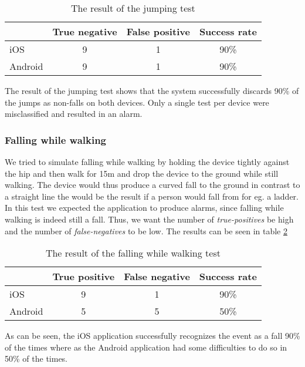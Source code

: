 \documentclass[12pt, a4paper, onecolumn]{article}
\begin{document}
			\begin{table}[H]
			\centering
			\begin{tabular}{|l|c|c|c|}
				\hline
				& True negative & False positive & Success rate \\ \hline
				iOS     & 9            & 1             & 90\%        \\ \hline
				Android & 9            & 1              & 90\%        \\ \hline
			\end{tabular}
			\caption{The result of the jumping test}
			\label{table:jump-test}
		\end{table}
	
		The result of the jumping test shows that the system successfully discards 90\% of the jumps as non-falls on both devices. Only a single test per device were misclassified and resulted in an alarm.
		
		\subsubsection{Falling while walking}
		\label{section:falling-while-walking}
		We tried to simulate falling while walking by holding the device tightly against the hip and then walk for 15m and drop the device to the ground while still walking. The device would thus produce a curved fall to the ground in contrast to a straight line the would be the result if a person would fall from for eg. a ladder. In this test we expected the application to produce alarms, since falling while walking is indeed still a fall. Thus, we want the number of \textit{true-positives} be high and the number of \textit{false-negatives} to be low. The results can be seen in table \ref{table:fall-while-walk}
		
			\begin{table}[H]
				\centering
				\begin{tabular}{|l|c|c|c|}
					\hline
					& True positive & False negative & Success rate \\ \hline
					iOS     & 9            & 1             & 90\%        \\ \hline
					Android & 5            & 5              & 50\%        \\ \hline
				\end{tabular}
				\caption{The result of the falling while walking test}
				\label{table:fall-while-walk}
			\end{table}

		As can be seen, the iOS application successfully recognizes the event as a fall 90\% of the times where as the Android application had some difficulties to do so in 50\% of the times.
		
\end{document}
